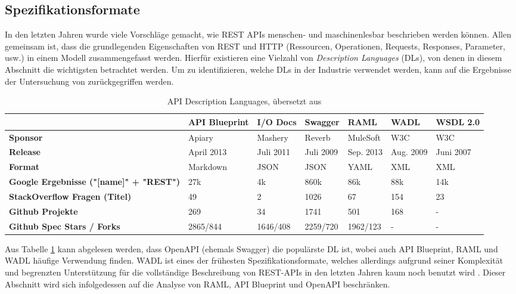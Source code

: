 \subsection{Spezifikationsformate}

In den letzten Jahren wurde viele Vorschläge gemacht, wie REST APIs menschen- und maschinenlesbar beschrieben werden können. Allen gemeinsam ist, dass die grundlegenden Eigenschaften von REST und HTTP (Ressourcen, Operationen, Requests, Responses, Parameter, usw.) in einem Modell zusammengefasst werden. Hierfür existieren eine Vielzahl von \emph{Description Languages} (DLs), von denen in diesem Abschnitt die wichtigsten betrachtet werden. Um zu identifizieren, welche DLs in der Industrie verwendet werden, kann auf die Ergebnisse der Untersuchung von \textcite{scherer2016description} zurückgegriffen werden. 

\begin{table}
\caption{API Description Languages, übersetzt aus \parencite[38]{scherer2016description}}
\label{tab:dls}
\scriptsize
\begin{tabularx}{\linewidth}{|p{2cm}|X|X|X|X|X|X|}
	\hline
    ~ & \textbf{API Blueprint} & \textbf{I/O Docs} & \textbf{Swagger} & \textbf{RAML} & \textbf{WADL} & \textbf{WSDL 2.0} \\
    \hline
    \textbf{Sponsor} & Apiary & Mashery & Reverb & MuleSoft & W3C & W3C \\
    \hline
    \textbf{Release} & April 2013 & Juli 2011 & Juli 2009 & Sep. 2013 & Aug. 2009 & Juni 2007 \\
    \hline
    \textbf{Format} & Markdown & JSON & JSON & YAML & XML & XML \\
    \hline
    \textbf{Google Ergebnisse ("[name]" + "REST")} & 27k & 4k & 860k & 86k & 88k & 14k \\
    \hline
    \textbf{StackOverflow Fragen (Titel)} & 49 & 2 & 1026 & 67 & 154 & 23 \\
    \hline
    \textbf{Github Projekte} & 269 & 34 & 1741 & 501 & 168 & - \\
    \hline
    \textbf{Github Spec Stars / Forks} & 2865/844 & 1646/408 & 2259/720 & 1962/123 & - & - \\
    \hline
\end{tabularx}
\end{table}

Aus Tabelle \ref{tab:dls} kann abgelesen werden, dass OpenAPI (ehemals Swagger) die populärste DL ist, wobei auch API Blueprint, RAML und WADL häufige Verwendung finden. WADL ist eines der frühesten Spezifikationsformate, welches allerdings aufgrund seiner Komplexität und begrenzten Unterstützung für die vollständige Beschreibung von REST-APIs in den letzten Jahren kaum noch benutzt wird \parencite[1]{ed2018automatic}. Dieser Abschnitt wird sich infolgedessen auf die Analyse von RAML, API Blueprint und OpenAPI beschränken. 

